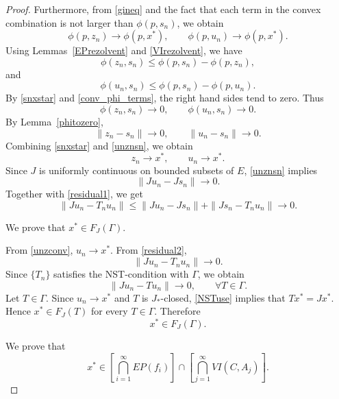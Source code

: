 \documentclass[10pt,a4paper]{amsart}
\begin{document}
\begin{proof}
Furthermore, from \eqref{gineq} and the fact that each term in the convex combination is not larger than $\phi(p,s_n)$, we obtain
\begin{equation}\label{conv_phi_terms}
\phi(p,z_n)\to \phi(p,x^{*}),\qquad \phi(p,u_n)\to \phi(p,x^{*}).
\end{equation}
Using Lemmas~\ref{EPrezolvent} and \ref{VIrezolvent}, we have
\[
\phi(z_n,s_n)\leq \phi(p,s_n)-\phi(p,z_n),
\]
and
\[
\phi(u_n,s_n)\leq \phi(p,s_n)-\phi(p,u_n).
\]
By \eqref{snxstar} and \eqref{conv_phi_terms}, the right hand sides tend to zero. Thus
\[
\phi(z_n,s_n)\to 0,
\qquad
\phi(u_n,s_n)\to 0.
\]
By Lemma~\ref{phitozero},
\begin{equation}\label{unznsn}
\|z_n-s_n\|\to 0,
\qquad
\|u_n-s_n\|\to 0.
\end{equation}
Combining \eqref{snxstar} and \eqref{unznsn}, we obtain
\begin{equation}\label{unzconv}
z_n\to x^{*},
\qquad
u_n\to x^{*}.
\end{equation}
Since $J$ is uniformly continuous on bounded subsets of $E$, \eqref{unznsn} implies
\[
\|Ju_n-Js_n\|\to 0.
\]
Together with \eqref{residual1}, we get
\begin{equation}\label{residual2}
\|Ju_n-T_nu_n\|\leq \|Ju_n-Js_n\|+\|Js_n-T_nu_n\|\to 0.
\end{equation}

 We prove that $x^{*}\in F_J(\Gamma)$.

From \eqref{unzconv}, $u_n\to x^{*}$. From \eqref{residual2},
\[
\|Ju_n-T_nu_n\|\to 0.
\]
Since $\{T_n\}$ satisfies the NST-condition with $\Gamma$, we obtain
\begin{equation}\label{NSTuse}
\|Ju_n-Tu_n\|\to 0,
\qquad \forall T\in \Gamma.
\end{equation}
Let $T\in\Gamma$. Since $u_n\to x^{*}$ and $T$ is $J_{*}$-closed, \eqref{NSTuse} implies that $Tx^{*}=Jx^{*}$. Hence $x^{*}\in F_J(T)$ for every $T\in\Gamma$. Therefore
\begin{equation}\label{fixedmembership}
x^{*}\in F_J(\Gamma).
\end{equation}

 We prove that
\[
x^{*}\in \left[\bigcap_{i=1}^{\infty}EP(f_i)\right]\cap\left[\bigcap_{j=1}^{\infty}VI(C,A_j)\right].
\]


\end{proof}
\end{document}
